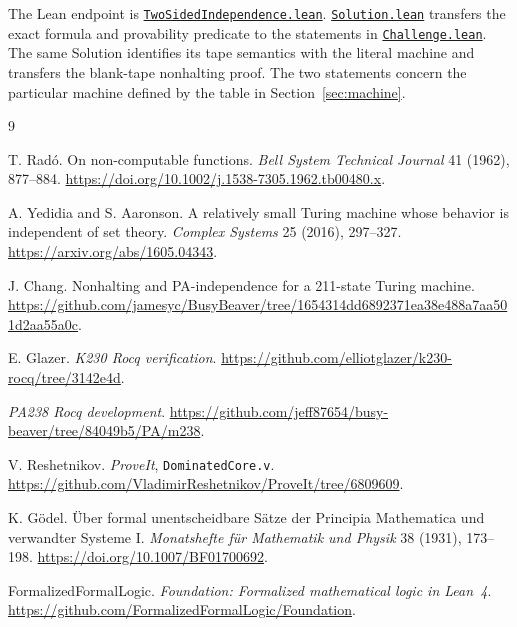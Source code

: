 \documentclass[11pt,letterpaper]{article}
\newcommand{\src}[2]{\href{https://github.com/jamesyc/BusyBeaver/blob/main/#1}{\texttt{\nolinkurl{#2}}}}
\begin{document}
The Lean endpoint is
\src{M6PA/TwoSidedIndependence.lean}{TwoSidedIndependence.lean}.
\src{Solution.lean}{Solution.lean} transfers the exact formula and
provability predicate to the statements in
\src{Challenge.lean}{Challenge.lean}. The same Solution identifies
its tape semantics with the literal machine and transfers the
blank-tape nonhalting proof. The two statements concern the
particular machine defined by the table in Section~\ref{sec:machine}.

\begin{thebibliography}{9}

T. Rad\'o.
On non-computable functions.
\emph{Bell System Technical Journal} 41 (1962), 877--884.
\url{https://doi.org/10.1002/j.1538-7305.1962.tb00480.x}.

A. Yedidia and S. Aaronson.
A relatively small Turing machine whose behavior is independent of set theory.
\emph{Complex Systems} 25 (2016), 297--327.
\url{https://arxiv.org/abs/1605.04343}.

J. Chang.
Nonhalting and PA-independence for a 211-state Turing machine.
\url{https://github.com/jamesyc/BusyBeaver/tree/1654314dd6892371ea38e488a7aa501d2aa55a0c}.

E. Glazer.
\emph{K230 Rocq verification}.
\url{https://github.com/elliotglazer/k230-rocq/tree/3142e4d}.

\emph{PA238 Rocq development}.
\url{https://github.com/jeff87654/busy-beaver/tree/84049b5/PA/m238}.

V. Reshetnikov.
\emph{ProveIt}, \texttt{DominatedCore.v}.
\url{https://github.com/VladimirReshetnikov/ProveIt/tree/6809609}.

K. G\"odel.
\"Uber formal unentscheidbare S\"atze der Principia Mathematica und
verwandter Systeme I.
\emph{Monatshefte f\"ur Mathematik und Physik} 38 (1931), 173--198.
\url{https://doi.org/10.1007/BF01700692}.

FormalizedFormalLogic.
\emph{Foundation: Formalized mathematical logic in Lean~4}.
\url{https://github.com/FormalizedFormalLogic/Foundation}.

\end{thebibliography}
\end{document}
